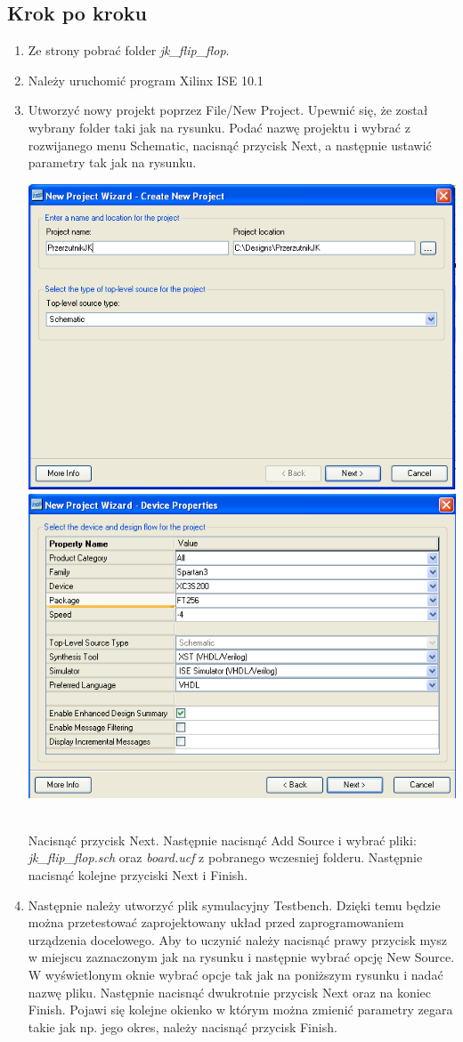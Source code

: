\documentclass[12pt]{article}
\begin{document}
\subsection{Krok po kroku}
\begin{enumerate}[wide, labelwidth=!, labelindent=0pt]	
\item Ze strony pobrać folder \textit{jk\_flip\_flop}.
\item Należy uruchomić program Xilinx ISE 10.1
\item Utworzyć nowy projekt poprzez File/New Project.
Upewnić się, że został wybrany folder taki jak na rysunku. Podać nazwę projektu i wybrać z rozwijanego menu Schematic, nacisnąć przycisk Next, a następnie ustawić parametry tak jak na rysunku.
\\\centerline{\includegraphics[width=0.49\linewidth]{1.PNG}\includegraphics[width=0.49\linewidth]{2.PNG}} \\
Nacisnąć przycisk Next. Następnie nacisnąć Add Source i wybrać pliki:\textit{ jk\_flip\_flop.sch} oraz \textit{board.ucf} z pobranego wczesniej folderu. Następnie nacisnąć kolejne przyciski Next i Finish.
\item Następnie należy utworzyć plik symulacyjny Testbench. Dzięki temu będzie można przetestować zaprojektowany układ przed zaprogramowaniem urządzenia docelowego. Aby to uczynić należy nacisnąć prawy przycisk mysz w miejscu zaznaczonym jak na rysunku i następnie wybrać opcję New Source. W wyświetlonym oknie wybrać opcje tak jak na poniższym rysunku i nadać nazwę pliku. Następnie nacisnąć dwukrotnie przycisk Next oraz na koniec Finish. Pojawi się kolejne okienko w którym można zmienić parametry zegara takie jak np. jego okres, należy nacisnąć przycisk Finish. \\

\end{enumerate}
\end{document}
